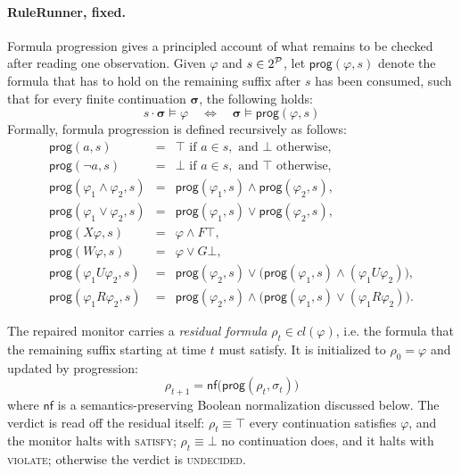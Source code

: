 \paragraph{RuleRunner, fixed.}
Formula progression gives a principled account of what remains to be checked after reading one observation. Given $\varphi$ and $s\in 2^{\mathcal{P}}$, let $\mathsf{prog}(\varphi,s)$ denote the formula that has to hold on the remaining suffix after $s$ has been consumed, such that for every finite continuation $\boldsymbol{\sigma}$, the following holds: 
\[
s\cdot\boldsymbol{\sigma}\models\varphi
\quad\Longleftrightarrow\quad
\boldsymbol{\sigma}\models\mathsf{prog}(\varphi,s)
\]
\noindent
Formally, formula progression is defined recursively as follows:
\[
\begin{array}{rcl}
\mathsf{prog}(a,s) &=& \top \text{ if } a\in s,\text{ and } \bot \text{ otherwise},\\
\mathsf{prog}(\neg a,s) &=& \bot \text{ if } a\in s,\text{ and } \top \text{ otherwise},\\
\mathsf{prog}(\varphi_1\land\varphi_2,s) &=&
    \mathsf{prog}(\varphi_1,s)\land\mathsf{prog}(\varphi_2,s),\\
\mathsf{prog}(\varphi_1\lor\varphi_2,s) &=&
    \mathsf{prog}(\varphi_1,s)\lor\mathsf{prog}(\varphi_2,s),\\
\mathsf{prog}(X\varphi,s) &=& \varphi \land F \top,\\
\mathsf{prog}(W\varphi,s) &=& \varphi \lor G \bot,\\
\mathsf{prog}(\varphi_1U\varphi_2,s) &=&
    \mathsf{prog}(\varphi_2,s)\lor
    \bigl(\mathsf{prog}(\varphi_1,s)\land(\varphi_1U\varphi_2)\bigr),\\
\mathsf{prog}(\varphi_1R\varphi_2,s) &=&
    \mathsf{prog}(\varphi_2,s)\land
    \bigl(\mathsf{prog}(\varphi_1,s)\lor(\varphi_1R\varphi_2)\bigr).
\end{array}
\]

\noindent 
The repaired monitor carries a \emph{residual formula} $\rho_t \in cl(\varphi)$, i.e. the formula that the remaining suffix starting at time $t$ must satisfy. It is initialized to $\rho_0 = \varphi$ and updated by progression:
\[
    \rho_{t+1} = \mathsf{nf}\bigl(\mathsf{prog}(\rho_t,\sigma_t)\bigr)
\]
where $\mathsf{nf}$ is a semantics-preserving Boolean normalization discussed below. The verdict is read off the residual itself: $\rho_t \equiv \top$ every continuation satisfies $\varphi$, and the monitor halts with \textsc{satisfy}; $\rho_t \equiv \bot$ no continuation does, and it halts with \textsc{violate}; otherwise the verdict is \textsc{undecided}.
%


